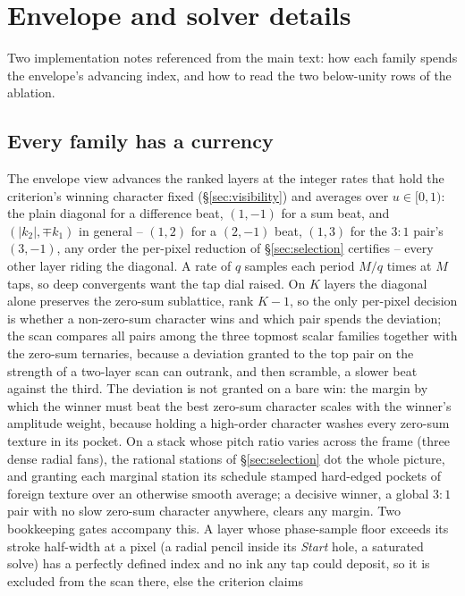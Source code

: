 \section{Envelope and solver details}
\label{supp:details}

Two implementation notes referenced from the main text: how each family spends
the envelope's advancing index, and how to read the two below-unity rows of the
ablation.

\subsection{Every family has a currency}

The envelope view advances the ranked layers at the integer rates that hold the
criterion's winning character fixed (\S\ref{sec:visibility}) and averages over
$u\in[0,1)$: the plain diagonal for a difference beat, $(1,-1)$ for a sum beat,
and $(\lvert k_2\rvert,\mp k_1)$ in general -- $(1,2)$ for a $(2,-1)$ beat,
$(1,3)$ for the $3{:}1$ pair's $(3,-1)$, any order the per-pixel reduction of
\S\ref{sec:selection} certifies -- every other layer riding the diagonal. A
rate of $q$ samples each period $M/q$ times at $M$ taps, so deep convergents
want the tap dial raised. On $K$ layers the diagonal alone preserves the zero-sum
sublattice, rank $K-1$, so the only per-pixel decision is whether a
non-zero-sum character wins and which pair spends the deviation; the scan
compares all pairs among the three topmost scalar families together with the
zero-sum ternaries, because a deviation granted to the top pair on the
strength of a two-layer scan can outrank, and then scramble, a slower beat
against the third. The deviation is not granted on a bare win: the margin by
which the winner must beat the best zero-sum character scales with the
winner's amplitude weight, because holding a high-order character washes
every zero-sum texture in its pocket. On a stack whose pitch ratio varies
across the frame (three dense radial fans), the rational stations of
\S\ref{sec:selection} dot the whole picture, and granting each marginal
station its schedule stamped hard-edged pockets of foreign texture over an
otherwise smooth average; a decisive winner, a global $3{:}1$ pair with no
slow zero-sum character anywhere, clears any margin. Two bookkeeping gates
accompany this. A layer whose phase-sample floor exceeds its stroke
half-width at a pixel (a radial pencil inside its \emph{Start} hole, a
saturated solve) has a perfectly defined index and no ink any tap could
deposit, so it is excluded from the scan there, else the criterion claims
